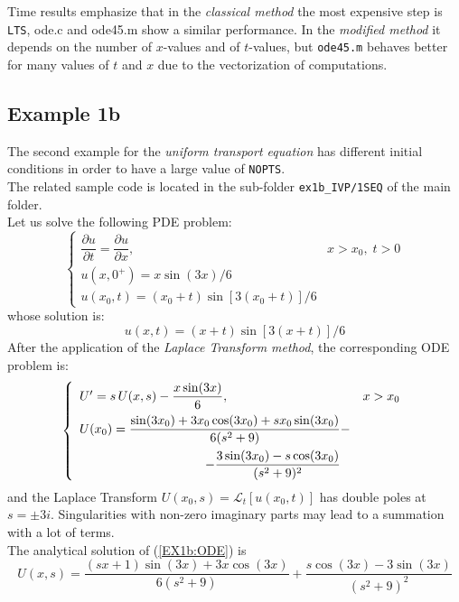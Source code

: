 \documentclass[a4paper,10pt]{report}%
\begin{document}
\newpage
\noindent Time results emphasize that in the {\em classical method} the most expensive step is {\tt LTS}, {ode.c} and {ode45.m} show a similar performance.
In the {\em modified method} it depends on the number of $x$-values and of $t$-values, but {\tt ode45.m} behaves
better for many values of $t$ and $x$ due to the vectorization of computations.



\subsection{Example 1b}
The second example for the {\em uniform transport equation} has different initial conditions in order
to have a large value of {\tt NOPTS}.
\\
The related sample code is located in the sub-folder {\tt ex1b\_IVP/1SEQ} of the main folder.
\\
Let us solve the following PDE problem:
\begin{equation}\label{EX1b:PDE}
\left\{\begin{array}{ll}
\dfrac{\partial u}{\partial t} = \dfrac{\partial u}{\partial x}, & x>x_0,\;t>0 \\[8pt]
u(x,0^+)  = x\sin(3x)/6 \\    
u(x_0,t) = (x_0+t)\sin [3(x_0+t)]/6
\end{array}\right.
\end{equation}
whose solution is:
\begin{equation}\label{SOLUTION:EX1b}
u(x,t) = (x+t) \sin [3(x+t)]/6
\end{equation}
After the application of the {\em Laplace Transform method}, the corresponding ODE problem is:
\begin{equation}\label{EX1b:ODE}
\left\{\begin{array}{ll}
U' = s\,U(x,s) - \dfrac{x\sin(3x)}{6}, & x>x_0 \\[8pt]
U(x_0) = \dfrac{\sin(3x_0)+3x_0\cos(3x_0)+sx_0\sin(3x_0)}{6(s^2+9)} - \\[10pt] 
\multicolumn{1}{r}{- \dfrac{3\sin(3x_0)-s\cos(3x_0)}{(s^2+9)^2}\phantom{-}}
\end{array}\right.
\end{equation}
and the Laplace Transform $U(x_0,s)=\mathscr{L}_t[u(x_0,t)]$ has double poles at $s=\pm 3i$. Singularities with non-zero imaginary parts may lead to a summation with a lot of terms.
\\
The analytical solution of (\ref{EX1b:ODE}) is
\begin{equation}\label{LT_SOLUTION:EX1b}
U(x,s) = \frac{(sx+1)\sin(3x) + 3x\cos(3x)}{6(s^2+9)} + \frac{s\cos(3x) - 3\sin(3x)}{(s^2+9)^2}
\end{equation}
\end{document}
